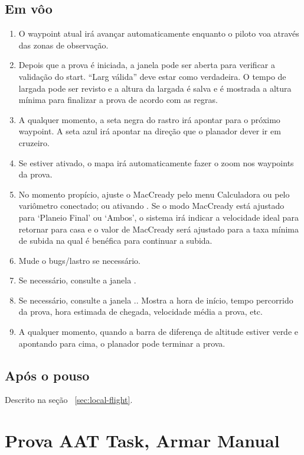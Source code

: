 \subsection*{Em vôo}
\begin{enumerate}
\item  O waypoint atual irá avançar automaticamente enquanto o piloto voa através das zonas de observação.
\item  Depois que a prova é iniciada, a janela   pode ser aberta para verificar a validação do start.  “Larg válida” deve estar como verdadeira.  O tempo de largada pode ser revisto e a altura da largada é salva e é mostrada a altura mínima para finalizar a prova de acordo com as regras.
\item  A qualquer momento, a seta negra do rastro irá apontar para o próximo waypoint.  A seta azul irá apontar na direção que o planador dever ir em cruzeiro.
\item  Se  estiver ativado, o mapa irá automaticamente fazer o zoom nos waypoints da prova.
\item  No momento propício, ajuste o MacCready pelo menu Calculadora ou pelo variômetro conectado; ou ativando   .
Se o modo MacCready está ajustado para ‘Planeio Final’ ou ‘Ambos’, o sistema irá indicar a velocidade ideal para retornar para casa e o valor de MacCready será ajustado para a taxa mínima de subida na qual é benéfica para continuar a subida.
\item  Mude o bugs/lastro se necessário.
\item  Se necessário, consulte a janela  . 
\item  Se necessário, consulte a janela  ..  Mostra a hora de início, tempo percorrido da prova, hora estimada de chegada, velocidade média a prova, etc.
\item  A qualquer momento, quando a barra de diferença de altitude estiver verde e apontando para cima, o planador pode terminar a prova.

\end{enumerate}

\subsection*{Após o pouso}
Descrito na seção ~\ref{sec:local-flight}.


\section{Prova AAT Task, Armar Manual}\label{sec:aat-task-manual}

